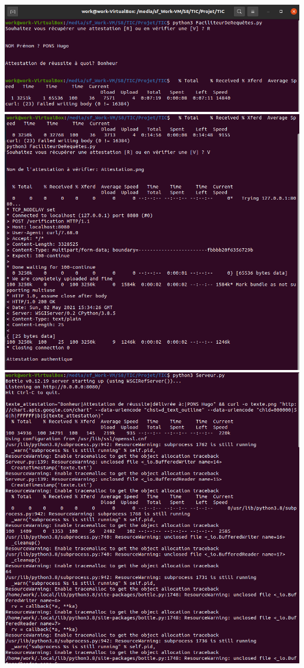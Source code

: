 \documentclass[12pt]{article}
\newcommand{\1}{\mathbbm{1}}
\begin{document}
\includegraphics[scale=0.5]{img1.png}
\newline
\break
\includegraphics[scale=0.5]{img2.png}
\newline
\break
\includegraphics[scale=0.5]{img3.png}











\end{document}
